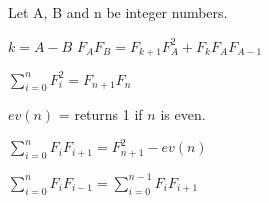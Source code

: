 
Let A, B and n be integer numbers.


$k = A - B$
$F_{A} F_{B} = F_{k + 1} F_{A} ^ 2 + F_{k} F_{A} F_{A - 1}$

$\sum_{i = 0}^{n} F_{i} ^ 2 = F_{n + 1} F_{n}$

$ev(n)$ = returns 1 if $n$ is even.

$\sum_{i = 0}^{n} F_{i} F_{i + 1} = F_{n + 1} ^ {2} - ev(n)$

$\sum_{i = 0}^{n} F_{i} F_{i - 1} = \sum_{i = 0}^{n - 1} F_{i} F_{i + 1}$
